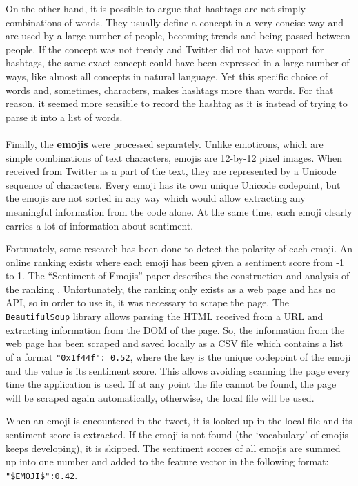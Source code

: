 On the other hand, it is possible to argue that hashtags are not simply combinations of words. They usually define a concept in a very concise way and are used by a large number of people, becoming trends and being passed between people. If the concept was not trendy and Twitter did not have support for hashtags, the same exact concept could have been expressed in a large number of ways, like almost all concepts in natural language. Yet this specific choice of words and, sometimes, characters, makes hashtags more than words. For that reason, it seemed more sensible to record the hashtag as it is instead of trying to parse it into a list of words. 

\paragraph{}
Finally, the \textbf{emojis} were processed separately. Unlike emoticons, which are simple combinations of text characters, emojis are 12-by-12 pixel images. When received from Twitter as a part of the text, they are represented by a Unicode sequence of characters. Every emoji has its own unique Unicode codepoint, but the emojis are not sorted in any way which would allow extracting any meaningful information from the code alone. At the same time, each emoji clearly carries a lot of information about sentiment. 

Fortunately, some research has been done to detect the polarity of each emoji. An online ranking exists where each emoji has been given a sentiment score from -1 to 1. The ``Sentiment of Emojis'' paper describes the construction and analysis of the ranking \cite{Kralj2015emojis}. Unfortunately, the ranking only exists as a web page and has no API, so in order to use it, it was necessary to scrape the page. The \texttt{BeautifulSoup} library allows parsing the HTML received from a URL and extracting information from the DOM of the page. So, the information from the web page has been scraped and saved locally as a CSV file which contains a list of a format \texttt{"0x1f44f": 0.52}, where the key is the unique codepoint of the emoji and the value is its sentiment score. This allows avoiding scanning the page every time the application is used. If at any point the file cannot be found, the page will be scraped again automatically, otherwise, the local file will be used. 

When an emoji is encountered in the tweet, it is looked up in the local file and its sentiment score is extracted. If the emoji is not found (the `vocabulary' of emojis keeps developing), it is skipped. The sentiment scores of all emojis are summed up into one number and added to the feature vector in the following format: \texttt{"\$EMOJI\$":0.42}. 

